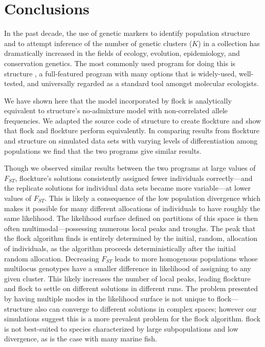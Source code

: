 \section*{Conclusions}
In the past decade, the use of genetic markers to identify population structure and to attempt inference of
the number of genetic clusters ($K$) in a collection has dramatically increased in the fields of ecology, evolution, 
epidemiology, and conservation
genetics. The most commonly used program for doing this is {\sc structure} \citep{Pritchardetal2000,Falushetal2003}, 
a full-featured program with many options that is widely-used, well-tested, and universally regarded as a standard tool amongst molecular ecologists. 


We have shown here that the model incorporated by {\sc flock} is analytically equivalent to {\sc structure}'s 
no-admixture model 
with non-correlated allele frequencies.
We adapted the source code of {\sc structure} to create {\sc flockture} and show that
{\sc flock} and {\sc flockture}  perform equivalently. 
In comparing results from {\sc flockture} and {\sc structure} 
on simulated data sets with varying levels of differentiation among populations
we find that the two programs give similar results.

Though we observed similar results
between the two programs at large values of $F_{ST}$, 
{\sc flockture}'s solutions consistently assigned fewer individuals correctly---and the
replicate solutions for individual data sets became more variable---at lower values of $F_{ST}$.
This is likely a consequence of the low population divergence which
makes it possible for many different allocations of individuals to
have roughly the same likelihood.
The likelihood surface defined on partitions of this space is then often
multimodal---possessing numerous local peaks and troughs.
The peak that the {\sc flock} algorithm finds is entirely determined by the initial, random, allocation of 
individuals, as the algorithm proceeds deterministically after the initial random allocation.
Decreasing $F_{ST}$ leads to more homogenous 
populations whose multilocus genotypes have a smaller difference in 
likelihood of assigning to any given cluster. This likely increases the number of
local peaks, leading {\sc flockture} and {\sc flock} to settle on different solutions in 
different runs. The problem presented by having multiple modes in the likelihood surface 
is not unique to {\sc flock}---{\sc structure} also can converge to 
different solutions in complex spaces; however our simulations suggest this is a more  
prevalent problem for the {\sc flock} algorithm.
{\sc flock} is not best-suited to species characterized by large
subpopulations and low divergence, as is the case with many 
marine fish.   
   

